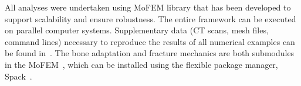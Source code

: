 \documentclass[onecolumn]{svjour3}
\begin{document}
All analyses were undertaken using MoFEM library \cite{mofemJoss2020} that has been developed to support scalability and ensure robustness. The entire framework can be executed on parallel computer systems. Supplementary data (CT scans, mesh files, command lines) necessary to reproduce the results of all numerical examples can be found in~\cite{karol_lewandowski_2019_dataset}. The bone adaptation and fracture mechanics are both submodules in the MoFEM~\cite{mofemJoss2020}, which can be installed using the flexible package manager, Spack~\cite{spack2015}. 


%
%


\end{document}
